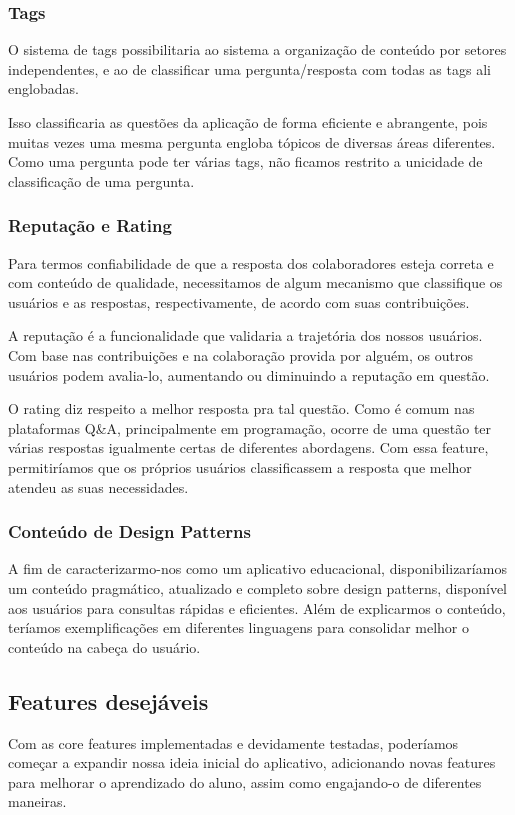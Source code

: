 \subsubsection{Tags}
O sistema de tags possibilitaria ao sistema a organização de conteúdo por setores independentes, e ao de classificar uma pergunta/resposta com todas as tags ali englobadas.

Isso classificaria as questões da aplicação de forma eficiente e abrangente, pois muitas vezes uma mesma pergunta engloba tópicos de diversas áreas diferentes. Como uma pergunta pode ter várias tags, não ficamos restrito a unicidade de classificação de uma pergunta.
\subsubsection{Reputação e Rating}
Para termos confiabilidade de que a resposta dos colaboradores esteja correta e com conteúdo de qualidade, necessitamos de algum mecanismo que classifique os usuários e as respostas, respectivamente, de acordo com suas contribuições.

A reputação é a funcionalidade que validaria a trajetória dos nossos usuários. Com base nas contribuições e na colaboração provida por alguém, os outros usuários podem avalia-lo, aumentando ou diminuindo a reputação em questão. 

O rating diz respeito a melhor resposta pra tal questão. Como é comum nas plataformas Q\&A, principalmente em programação, ocorre de uma questão ter várias respostas igualmente certas de diferentes abordagens. Com essa feature, permitiríamos que os próprios usuários classificassem a resposta que melhor atendeu as suas necessidades.

\subsubsection{Conteúdo de Design Patterns}
A fim de caracterizarmo-nos como um aplicativo educacional, disponibilizaríamos um conteúdo pragmático, atualizado e completo sobre design patterns, disponível aos usuários para consultas rápidas e eficientes. Além de explicarmos o conteúdo, teríamos exemplificações em diferentes linguagens para consolidar melhor o conteúdo na cabeça do usuário.

\subsection{Features desejáveis}
Com as core features implementadas e devidamente testadas, poderíamos começar a expandir nossa ideia inicial do aplicativo, adicionando novas features para melhorar o aprendizado do aluno, assim como engajando-o de diferentes maneiras.

